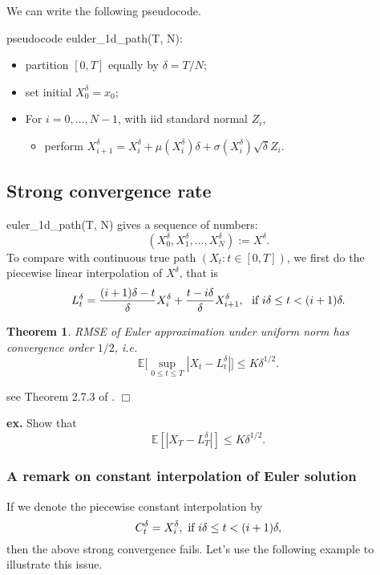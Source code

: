 \documentclass{article}
\newtheorem{theorem}{Theorem}
\newenvironment{proof}{\noindent {\sc Proof:}}{$\Box$} %
\begin{document}
We can write the following pseudocode.

pseudocode eulder\_1d\_path(T, N):
\begin{itemize}
 \item partition $[0, T]$ equally by $\delta = T/N$;
 \item set initial $X_{0}^{\delta} = x_{0}$;
 \item For $i = 0, \ldots, N-1$,  with iid standard normal $Z_{i}$, 
\begin{itemize}
 \item perform $X_{i+1}^{\delta} = X_{i}^{\delta} + \mu(X_{i}^{\delta}) \delta + 
 \sigma(X_{i}^{\delta}) \sqrt \delta Z_{i}.$
\end{itemize}

\end{itemize}


\subsection{Strong convergence rate}

euler\_1d\_path(T, N) gives a sequence of numbers:
$$(X_{0}^{\delta}, X_{1}^{\delta}, \ldots, X_{N}^{\delta}) := X^{\delta}.$$
To compare with continuous true path $(X_{t}: t\in [0,T])$, we first do the piecewise linear interpolation of $X^{\delta}$, that is
$$L^{\delta}_{t} = \frac{(i+1)\delta - t}{\delta} X_{i}^{\delta} 
+ \frac{t - i\delta}{\delta} X_{i+1}^{\delta}, \ \hbox{ if } 
i\delta \le t < (i+1)\delta.$$

\begin{theorem}
 RMSE of Euler approximation 
 under uniform norm has convergence order $1/2$, i.e.
 $$\mathbb E \Big [\sup_{0 \le t\le T} |X_{t} - L_{t}^{\delta}| \Big] \le K \delta^{1/2}.$$
\end{theorem}
\begin{proof}
 see Theorem 2.7.3 of \cite{Mao07}.
\end{proof}

{\bf ex.} Show that 
$$\mathbb E [ |X_{T} - L_{T}^{\delta} | ] \le K \delta^{1/2}.$$

\subsubsection{A remark on constant interpolation of Euler solution}
If we denote the piecewise constant interpolation by
$$C_{t}^{\delta} = 
X_{i}^{\delta}, \hbox{ if } i\delta \le t < (i+1) \delta, $$
then the above strong convergence fails. Let's use the following example to illustrate this issue.
\end{document}
